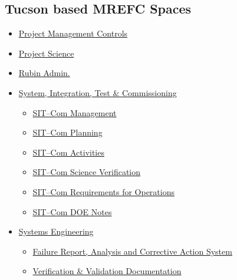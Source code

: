 \begin{small}

\subsection{Tucson based MREFC Spaces}

\begin{itemize}
	\item \href{https://confluence.lsstcorp.org/display/PC/Project+Management+Controls+System+Home}{Project Management Controls}
	\item \href{https://confluence.lsstcorp.org/display/PS/Project+Science+Home}{Project Science}
	\item \href{https://confluence.lsstcorp.org/display/ROA/Rubin+Obs.+Admins}{Rubin Admin.}
	\item \href{https://confluence.lsstcorp.org/pages/viewpage.action?pageId=48399826}{System, Integration, Test \& Commissioning}
	\begin{itemize}
		\item \href{https://confluence.lsstcorp.org/display/LSSTCOM/SIT-Com+Management?src=contextnavpagetreemode}{SIT--Com Management}
		\item \href{https://confluence.lsstcorp.org/display/LSSTCOM/SIT-Com+Planning?src=contextnavpagetreemode}{SIT--Com Planning}
		\item \href{https://confluence.lsstcorp.org/display/LSSTCOM/SIT-Com+Activities?src=contextnavpagetreemode}{SIT--Com Activities}
		\item \href{https://confluence.lsstcorp.org/display/LSSTCOM/SIT-Com+Science+Verification?src=contextnavpagetreemode}{SIT--Com Science Verification}
		\item\href{https://confluence.lsstcorp.org/display/LSSTCOM/SIT-Com+Requirements+for+Operations?src=contextnavpagetreemode}{SIT--Com Requirements for Operations}
		\item \href{https://confluence.lsstcorp.org/display/LSSTCOM/DOE+Notes?src=contextnavpagetreemode}{SIT--Com DOE Notes}
	\end{itemize}
	\item \href{https://confluence.lsstcorp.org/display/SYSENG/Systems+Engineering+Home}{Systems Engineering}
	\begin{itemize}
		\item \href{https://confluence.lsstcorp.org/pages/viewpage.action?pageId=97681640}{Failure Report, Analysis and Corrective Action System}
		\item \href{https://confluence.lsstcorp.org/pages/viewpage.action?pageId=100173626}{Verification \& Validation Documentation}

\end{itemize}
\end{itemize}
\end{small}
